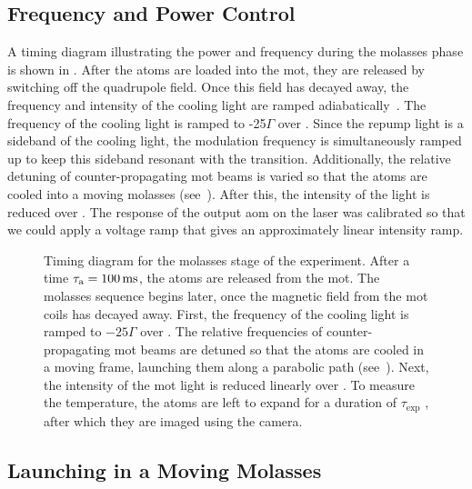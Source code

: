 \subsection{Frequency and Power Control}\label{subsec:molasses_control}
A timing diagram illustrating the power and frequency during the
molasses phase is shown in .
After the atoms are loaded into the \ac{mot}, they are released by
switching off the quadrupole field. Once this field has decayed away,
the frequency and intensity of the cooling light are ramped
adiabatically~\cite{Molmer1990}. The frequency of the cooling light is ramped to
-25\(\Gamma\) over . Since the repump
light is a sideband of the cooling light, the modulation frequency is
simultaneously ramped up to keep this sideband resonant with the
 transition. Additionally, the relative detuning of
counter-propagating \ac{mot} beams is varied so that the atoms are
cooled into a moving molasses
(see~). After this, the intensity
of the light is reduced over . The response
of the output \ac{aom} on the \Muquans laser was calibrated so that we
could apply a voltage ramp that gives an approximately linear
intensity ramp.
\begin{figure}[!htbp]
    \centering
    \fontsize{14pt}{14pt}
    \resizebox{0.7\textwidth}{!}{}
    \caption[Molasses stage timing diagram]{Timing diagram for the
    molasses stage of the experiment. After a time \(\tau_\text{a} =
  \sivalue{100}{\milli\second}\), the atoms are released from the
\ac{mot}. The molasses sequence begins 
later, once the magnetic field from the \ac{mot} coils has decayed
away. First, the frequency of the cooling light is ramped to \(-25
\Gamma\) over . The relative frequencies
of counter-propagating \ac{mot} beams are detuned so that the atoms
are cooled in a moving frame, launching them along a parabolic path
(see~). Next, the intensity of the
\ac{mot} light is reduced linearly over . To
measure the temperature, the atoms are left to expand for a duration
of \(\tau_\text{exp}\) \sivalue{}{\milli\second}, after which they are
imaged using the camera.}
    \label{fig:molasses_timing}
\end{figure}
\subsection{Launching in a Moving Molasses}\label{subsec:moving_molasses}

